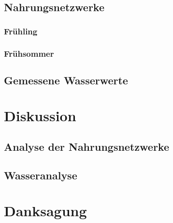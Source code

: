 \documentclass{article}
\begin{document}
    \subsection{Nahrungsnetzwerke}
        
    
        \subsubsection{Frühling}
        
        \subsubsection{Frühsommer}
        
    \subsection{Gemessene Wasserwerte}


\section{Diskussion}

    \subsection{Analyse der Nahrungsnetzwerke}
    
        
    
    \subsection{Wasseranalyse}
    

\section{Danksagung}
\end{document}
